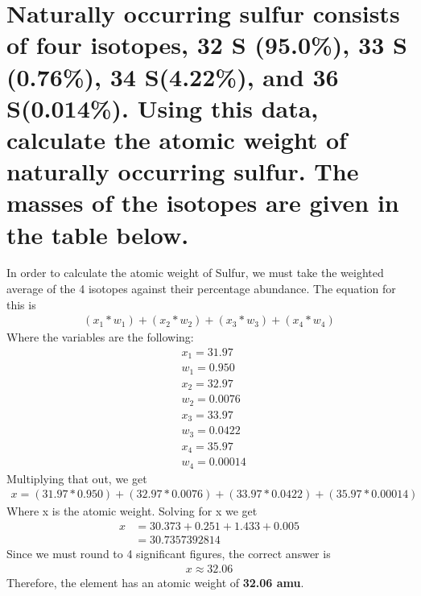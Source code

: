 \documentclass[11pt]{article}
\begin{document}
\section{Naturally occurring sulfur consists of four isotopes, 32 S (95.0\%), 33 S (0.76\%), 34 S(4.22\%), and 36 S(0.014\%). Using this data, calculate the atomic weight of naturally occurring sulfur. The masses of the isotopes are given in the table below.}
\label{sec:org4d62ab1}
In order to calculate the atomic weight of Sulfur, we must take the weighted
average of the 4 isotopes against their percentage abundance. The equation for
this is
\begin{align*}
(x_1*w_1)+(x_2*w_2)+(x_3*w_3)+(x_4*w_4)
\end{align*}
Where the variables are the following:
\begin{align*}
&x_{1}=31.97\\
&w_{1}=0.950\\
&x_{2}=32.97\\
&w_{2}=0.0076\\
&x_{3}=33.97\\
&w_{3}=0.0422\\
&x_{4}=35.97\\
&w_{4}=0.00014
\end{align*}
Multiplying that out, we get
\begin{align*}
x=(31.97*0.950)+(32.97*0.0076)+(33.97*0.0422)+(35.97*0.00014)
\end{align*}
Where x is the atomic weight. Solving for x we get
\begin{align*}
x&=30.373 + 0.251 + 1.433 + 0.005\\
&=30.7357392814
\end{align*}
Since we must round to 4 significant figures, the correct answer is
\begin{align*}
x\approx32.06
\end{align*}
Therefore, the element has an atomic weight of \textbf{32.06 amu}.
\end{document}
